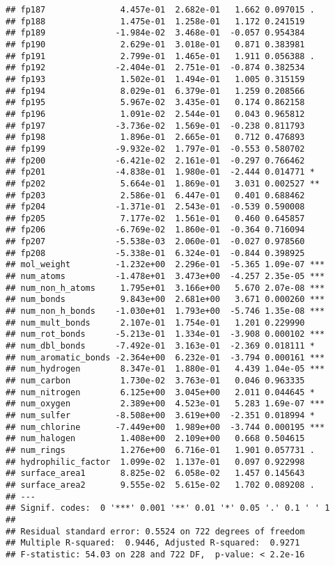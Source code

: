 \documentclass[
]{article}
\begin{document}
\begin{verbatim}
## fp187               4.457e-01  2.682e-01   1.662 0.097015 .  
## fp188               1.475e-01  1.258e-01   1.172 0.241519    
## fp189              -1.984e-02  3.468e-01  -0.057 0.954384    
## fp190               2.629e-01  3.018e-01   0.871 0.383981    
## fp191               2.799e-01  1.465e-01   1.911 0.056388 .  
## fp192              -2.404e-01  2.751e-01  -0.874 0.382534    
## fp193               1.502e-01  1.494e-01   1.005 0.315159    
## fp194               8.029e-01  6.379e-01   1.259 0.208566    
## fp195               5.967e-02  3.435e-01   0.174 0.862158    
## fp196               1.091e-02  2.544e-01   0.043 0.965812    
## fp197              -3.736e-02  1.569e-01  -0.238 0.811793    
## fp198               1.896e-01  2.665e-01   0.712 0.476893    
## fp199              -9.932e-02  1.797e-01  -0.553 0.580702    
## fp200              -6.421e-02  2.161e-01  -0.297 0.766462    
## fp201              -4.838e-01  1.980e-01  -2.444 0.014771 *  
## fp202               5.664e-01  1.869e-01   3.031 0.002527 ** 
## fp203               2.586e-01  6.447e-01   0.401 0.688462    
## fp204              -1.371e-01  2.543e-01  -0.539 0.590008    
## fp205               7.177e-02  1.561e-01   0.460 0.645857    
## fp206              -6.769e-02  1.860e-01  -0.364 0.716094    
## fp207              -5.538e-03  2.060e-01  -0.027 0.978560    
## fp208              -5.338e-01  6.324e-01  -0.844 0.398925    
## mol_weight         -1.232e+00  2.296e-01  -5.365 1.09e-07 ***
## num_atoms          -1.478e+01  3.473e+00  -4.257 2.35e-05 ***
## num_non_h_atoms     1.795e+01  3.166e+00   5.670 2.07e-08 ***
## num_bonds           9.843e+00  2.681e+00   3.671 0.000260 ***
## num_non_h_bonds    -1.030e+01  1.793e+00  -5.746 1.35e-08 ***
## num_mult_bonds      2.107e-01  1.754e-01   1.201 0.229990    
## num_rot_bonds      -5.213e-01  1.334e-01  -3.908 0.000102 ***
## num_dbl_bonds      -7.492e-01  3.163e-01  -2.369 0.018111 *  
## num_aromatic_bonds -2.364e+00  6.232e-01  -3.794 0.000161 ***
## num_hydrogen        8.347e-01  1.880e-01   4.439 1.04e-05 ***
## num_carbon          1.730e-02  3.763e-01   0.046 0.963335    
## num_nitrogen        6.125e+00  3.045e+00   2.011 0.044645 *  
## num_oxygen          2.389e+00  4.523e-01   5.283 1.69e-07 ***
## num_sulfer         -8.508e+00  3.619e+00  -2.351 0.018994 *  
## num_chlorine       -7.449e+00  1.989e+00  -3.744 0.000195 ***
## num_halogen         1.408e+00  2.109e+00   0.668 0.504615    
## num_rings           1.276e+00  6.716e-01   1.901 0.057731 .  
## hydrophilic_factor  1.099e-02  1.137e-01   0.097 0.922998    
## surface_area1       8.825e-02  6.058e-02   1.457 0.145643    
## surface_area2       9.555e-02  5.615e-02   1.702 0.089208 .  
## ---
## Signif. codes:  0 '***' 0.001 '**' 0.01 '*' 0.05 '.' 0.1 ' ' 1
## 
## Residual standard error: 0.5524 on 722 degrees of freedom
## Multiple R-squared:  0.9446, Adjusted R-squared:  0.9271 
## F-statistic: 54.03 on 228 and 722 DF,  p-value: < 2.2e-16
\end{verbatim}
\end{document}
